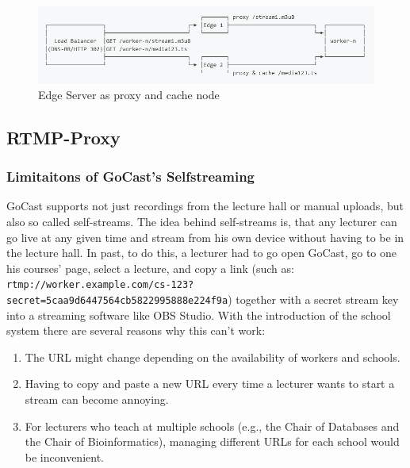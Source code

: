 \begin{figure}[htpb]
    \centering
    \includegraphics[width=\linewidth]{images/EdgeNetwork.png}
    \caption[Edge Server as proxy and cache node]{Edge Server as proxy and cache node}\label{fig:edge-network}
\end{figure}


\subsection{RTMP-Proxy}

\subsubsection{Limitaitons of GoCast's Selfstreaming}

GoCast supports not just recordings from the lecture hall or manual uploads, but also so called self-streams. The idea behind self-streams is, that any lecturer can go live at any given time and stream from his own device without having to be in the lecture hall. In past, to do this, a lecturer had to go open GoCast, go to one his courses' page, select a lecture, and copy a link (such as: \texttt{rtmp://worker.example.com/cs-123? secret=5caa9d6447564cb5822995888e224f9a}) together with a secret stream key into a streaming software like OBS Studio. With the introduction of the school system there are several reasons why this can't work:

\begin{enumerate}
    \item The URL might change depending on the availability of workers and schools.
    \item Having to copy and paste a new URL every time a lecturer wants to start a stream can become annoying.
    \item For lecturers who teach at multiple schools (e.g., the Chair of Databases and the Chair of Bioinformatics), managing different URLs for each school would be inconvenient.
\end{enumerate}

